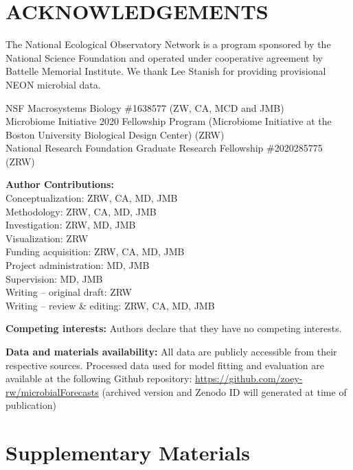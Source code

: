 \documentclass[11pt]{article}
\begin{document}
\section{ACKNOWLEDGEMENTS}

The National Ecological Observatory Network is a program sponsored by the National Science Foundation and operated under cooperative agreement by Battelle Memorial Institute. We thank Lee Stanish for providing provisional NEON microbial data.

NSF Macrosystems Biology \#1638577 (ZW, CA, MCD and JMB) \\
Microbiome Initiative 2020 Fellowship Program (Microbiome Initiative at the Boston University Biological Design Center) (ZRW) \\
National Research Foundation Graduate Research Fellowship \#2020285775 (ZRW)

\textbf{Author Contributions:} \\
Conceptualization: ZRW, CA, MD, JMB \\
Methodology:  ZRW, CA, MD, JMB \\
Investigation:  ZRW, MD, JMB \\
Visualization:  ZRW \\
Funding acquisition:  ZRW, CA, MD, JMB \\
Project administration: MD, JMB \\
Supervision: MD, JMB \\
Writing – original draft: ZRW \\
Writing – review \& editing:  ZRW, CA, MD, JMB

\textbf{Competing interests:} Authors declare that they have no competing interests.

\textbf{Data and materials availability:} All data are publicly accessible from their respective sources. Processed data used for model fitting and evaluation are available at the following Github repository: \url{https://github.com/zoey-rw/microbialForecasts} (archived version and Zenodo ID will generated at time of publication)




\clearpage
\setcounter{figure}{0}
\renewcommand{\thefigure}{S\arabic{figure}}
\setcounter{table}{0}
\renewcommand{\thetable}{S\arabic{table}}
\setcounter{equation}{0}
\renewcommand{\theequation}{S\arabic{equation}}

\section*{Supplementary Materials}
\end{document}
